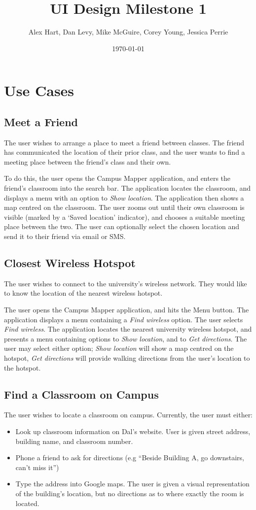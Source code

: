 \documentclass{article}
\title{UI Design Milestone 1}
\author{Alex Hart, Dan Levy, Mike McGuire, Corey Young, Jessica Perrie}
\date{\today}
\begin{document}
\maketitle

\section{Use Cases}
\subsection{Meet a Friend}
The user wishes to arrange a place to meet a friend between classes.
The friend has communicated the location of their prior class, and the user
wants to find a meeting place between the friend's class and their own.

To do this, the user opens the Campus Mapper application, and enters the
friend's classroom into the search bar. The application locates the classroom,
and displays a menu with an option to \emph{Show location}. The application
then shows a map centred on the classroom. The user zooms out until their own
classroom is visible (marked by a `Saved location' indicator), and chooses a
suitable meeting place between the two. The user can optionally select the
chosen location and send it to their friend via email or SMS.

\subsection{Closest Wireless Hotspot}
The user wishes to connect to the university's wireless network. They would like
to know the location of the nearest wireless hotspot.

The user opens the Campus Mapper application, and hits the Menu button. The
application displays a menu containing a \emph{Find wireless} option.
The user selects \emph{Find wireless}. The application locates the nearest
university wireless hotspot, and presents a menu containing options to
\emph{Show location}, and to \emph{Get directions}. The user may select either
option; \emph{Show location} will show a map centred on the hotspot, \emph{Get
directions} will provide walking directions from the user's location to the
hotspot.

\subsection{Find a Classroom on Campus}
The user wishes to locate a classroom on campus. Currently, the user must either:
\begin{itemize}
\item Look up classroom information on Dal's website.  User is given street
address, building name, and classroom number. 
\item Phone a friend to ask for directions (e.g ``Beside Building A, go
downstairs, can't miss it'')
\item Type the address into Google maps. The user is given a visual
representation of the building's location, but no directions as to where exactly
the room is located. 
\end{itemize}
\end{document}
